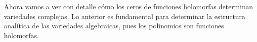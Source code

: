     
    Ahora vamos a ver con detalle cómo los ceros de funciones holomorfas determinan variedades complejas. Lo anterior es fundamental para determinar la estructura analítica de las variedades algebraicas, pues los polinomios son funciones holomorfas.
    
